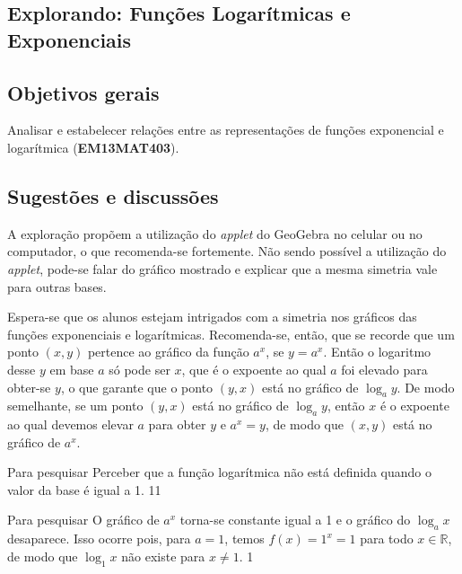 \clearpage
\def\currentcolor{session1}
\begin{texto}
{
	\section{Explorando: Funções Logarítmicas e Exponenciais}
	\subsection{Objetivos gerais}
	Analisar e estabelecer relações entre as representações de funções exponencial e logarítmica (\textbf{EM13MAT403}).

	\subsection{Sugestões e discussões}
	A exploração propõem a utilização do \textit{applet} do GeoGebra no celular ou no computador, o que recomenda-se fortemente. Não sendo possível a utilização do \textit{applet}, pode-se falar do gráfico mostrado e explicar que a mesma simetria vale para outras bases.

	Espera-se que os alunos estejam intrigados com a simetria nos gráficos das funções exponenciais e logarítmicas. Recomenda-se, então, que se recorde que um ponto $(x,y)$ pertence ao gráfico da função $a^x$, se $y=a^x$. Então o logaritmo desse $y$ em base $a$ só pode ser $x$, que é o expoente ao qual $a$ foi elevado para obter-se $y$, o que garante que o ponto $(y,x)$ está no gráfico de $\log_a y$. De modo semelhante, se um ponto $(y,x)$ está no gráfico de $\log_a y$, então $x$ é o expoente ao qual devemos elevar $a$ para obter $y$ e $a^x=y$, de modo que $(x,y)$ está no gráfico de $a^x$.
}
\end{texto}
\begin{objectives}{Para pesquisar}
{
	Perceber que a função logarítmica não está definida quando o valor da base é igual a 1.
}{1}{1}
\end{objectives}
\begin{answer}{Para pesquisar}
{
	O gráfico de $a^x$ torna-se constante igual a 1 e o gráfico do $\log_a x$ desaparece. Isso ocorre pois, para $a=1$, temos $f(x)=1^x =1$ para todo $x \in \mathbb{R}$, de modo que $\log_1 x$ não existe para $x \neq 1$.
}{1}
\end{answer}
\clearmargin

